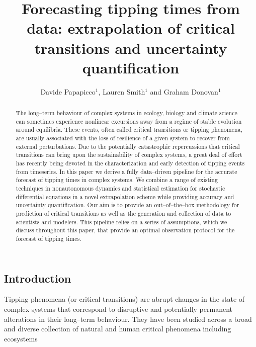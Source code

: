 \documentclass[openacc]{rsproca_new}
\begin{document}
\title{Forecasting tipping times from data: extrapolation of critical transitions and uncertainty quantification}

\author{Davide Papapicco$^{1}$, Lauren Smith$^{1}$ and Graham Donovan$^{1}$}
\address{$^{1}$Department of Mathematics, University of Auckland, New Zealand}

\subject{applied mathematics, differential equations, statistical physics}

\begin{abstract}
        The long--term behaviour of complex systems in ecology, biology and climate science can sometimes experience nonlinear excursions away from a regime of stable evolution around equilibria.
        These events, often called critical transitions or tipping phenomena, are usually associated with the loss of resilience of a given system to recover from external perturbations.
        Due to the potentially catastrophic repercussions that critical transitions can bring upon the sustainability of complex systems, a great deal of effort has recently being devoted in the characterization and early detection of tipping events from timeseries.
        In this paper we derive a fully data--driven pipeline for the accurate forecast of tipping times in complex systems.
        We combine a range of existing techniques in nonautonomous dynamics and statistical estimation for stochastic differential equations in a novel extrapolation scheme while providing accuracy and uncertainty quantification.
        Our aim is to provide an out--of--the--box methodology for prediction of critical transitions as well as the generation and collection of data to scientists and modelers.
        This pipeline relies on a series of assumptions, which we discuss throughout this paper, that provide an optimal observation protocol for the forecast of tipping times.
        \absbreak 
\end{abstract}

\begin{fmtext}
        \section{Introduction}
        Tipping phenomena (or critical transitions) are abrupt changes in the state of complex systems that correspond to disruptive and potentially permanent alterations in their long--term behaviour.
        They have been studied across a broad and diverse collection of natural and human critical phenomena including ecosystems 
\end{fmtext}
\end{document}
